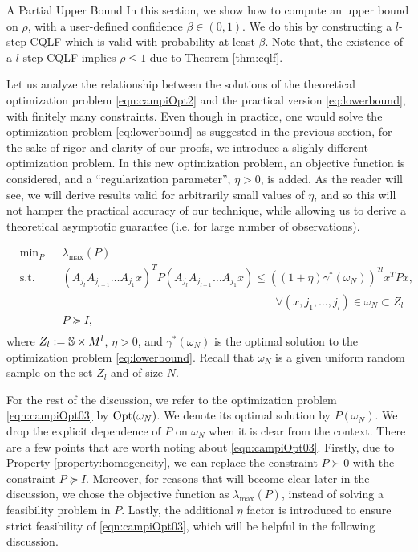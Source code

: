 \begin{subsection}{A Partial Upper Bound}\label{sec:IntroMainThm}
In this section, we show how to compute an upper bound on $\rho$, with a user-defined confidence $\beta \in (0, 1)$. We do this by constructing a $l$-step CQLF which is valid with probability at least $\beta$. Note that, the existence of a $l$-step CQLF implies $\rho \leq 1$ due to Theorem \ref{thm:cqlf}.

Let us analyze the relationship between the solutions of the theoretical optimization problem \eqref{eqn:campiOpt2} and the practical version \eqref{eq:lowerbound}, with finitely many constraints. Even though in practice, one would solve the optimization problem  \eqref{eq:lowerbound} as suggested in the previous section, for the sake of rigor and clarity of our proofs, we introduce a slighly different optimization problem. In this new optimization problem, an objective function is considered, and a ``regularization parameter'', $\eta > 0$, is added. As the reader will see, we will derive results valid for arbitrarily small values of $\eta$, and so this will not hamper the practical accuracy of our technique, while allowing us to derive a theoretical asymptotic guarantee (i.e. for large number of observations).

\begin{equation}\label{eqn:campiOpt03}
\begin{aligned}
& \text{min}_{P} & & \lambda_{\max}(P) \\
& \text{s.t.} 
&  & (A_{j_l} A_{j_{l-1}} \dots A_{j_1} x)^T P (A_{j_l} A_{j_{l-1}} \dots A_{j_1} x) \leq {((1 +\eta)\gamma^*(\omega_N))}^{2l} x^T P x,\\
&&&\qquad \qquad \qquad \qquad \qquad \qquad \qquad \qquad \quad \qquad \forall (x, j_{1},\dots, j_{l}) \in \omega_N \subset Z_l \\
& && P \succeq I, \\
\end{aligned}
\end{equation}
where $Z_l:= \mathbb{S} \times M^l$, $\eta > 0$, and $\gamma^*(\omega_N)$ is the optimal solution to the optimization problem \eqref{eq:lowerbound}. Recall that $\omega_N$ is a given uniform random sample on the set $Z_l$ and of size $N$. 

For the rest of the discussion, we refer to the optimization problem \eqref{eqn:campiOpt03} by $ \text{Opt}(\omega_N)$. We denote its optimal solution by $P(\omega_N)$. We drop the explicit dependence of $P$ on $\omega_N$ when it is clear from the context. There are a few points that are worth noting about \eqref{eqn:campiOpt03}. Firstly, due to Property \ref{property:homogeneity}, we can replace the constraint $P \succ 0$ with the constraint $P \succeq I$. Moreover, for reasons that will become clear later in the discussion, we chose the objective function as $\lambda_{\max}(P)$, instead of solving a feasibility problem in $P$. Lastly, the additional $\eta$ factor is introduced to ensure strict feasibility of \eqref{eqn:campiOpt03}, which will be helpful in the following discussion.


\end{subsection}
